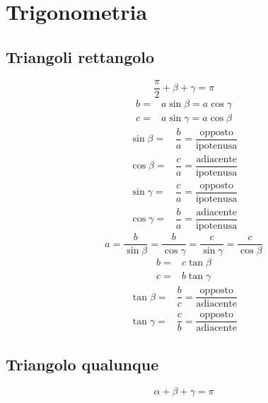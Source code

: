 \chapter{Trigonometria}
\section{Triangoli rettangolo}
\begin{center}
		
\end{center}
\begin{equation*}
\dfrac{\pi}{2}+\beta+\gamma=\pi
\end{equation*}
\begin{align*}
b=&a\sin\beta=a\cos\gamma\\
c=&a\sin\gamma=a\cos\beta
\end{align*}
\begin{align*}
\sin\beta=&\dfrac{b}{a}=\dfrac{\text{opposto}}{\text{ipotenusa}}\\
\cos\beta=&\dfrac{c}{a}=\dfrac{\text{adiacente}}{\text{ipotenusa}}\\
\sin\gamma=&\dfrac{c}{a}=\dfrac{\text{opposto}}{\text{ipotenusa}}\\
\cos\gamma=&\dfrac{b}{a}=\dfrac{\text{adiacente}}{\text{ipotenusa}}
\end{align*}
\begin{equation*}
a=\dfrac{b}{\sin\beta}=\dfrac{b}{\cos\gamma}=\dfrac{c}{\sin\gamma}=\dfrac{c}{\cos\beta}
\end{equation*}
\begin{align*}
b=&c\tan\beta\\
c=&b\tan\gamma
\end{align*}
\begin{align*}
\tan\beta=&\dfrac{b}{c}=\dfrac{\text{opposto}}{\text{adiacente}}\\
\tan\gamma=&\dfrac{c}{b}=\dfrac{\text{opposto}}{\text{adiacente}}
\end{align*}
\section{Triangolo qualunque}
\begin{center}
	
\end{center}
\begin{equation*}
\alpha+\beta+\gamma=\pi
\end{equation*}
